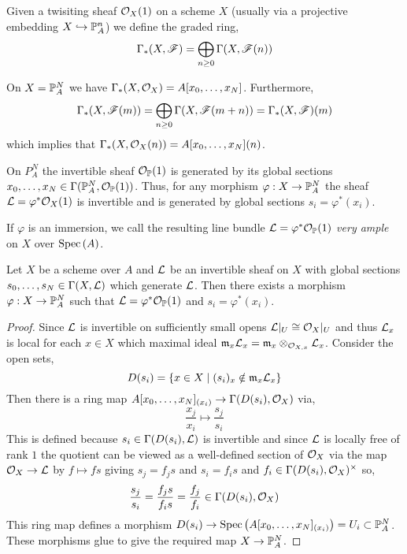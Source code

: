 \documentclass[12pt]{article}
\begin{document}
\begin{definition}
Given a twisiting sheaf $\struct{X}(1)$ on a scheme $X$ (usually via a projective embedding $X \embed \P^n_A$) we define the graded ring,
\[ \Gamma_*(X, \F) = \bigoplus_{n \ge 0} \Gamma(X, \F(n)) \]
\end{definition}


\begin{proposition}
On $X = \P^N_A$ we have $\Gamma_*(X, \struct{X}) = A[x_0, \dots, x_N]$. 
Furthermore,
\[ \Gamma_*(X, \F(m)) = \bigoplus_{n \ge 0} \Gamma(X, \F(m + n)) = \Gamma_*(X, \F)(m) \]
which implies that $\Gamma_*(X, \struct{X}(n)) = A[x_0, \dots, x_N](n)$.  
\end{proposition}

\begin{proposition}
On $P^N_A$ the invertible sheaf $\struct{\P}(1)$ is generated by its global sections $x_0, \dots, x_N \in \Gamma(\P^N_A, \struct{\P}(1))$. Thus, for any morphism $\varphi : X \to \P^N_A$ the sheaf $\L = \varphi^* \struct{X}(1)$ is invertible and is generated by global sections $s_i = \varphi^*(x_i)$. 
\end{proposition}

\begin{definition}
If $\varphi$ is an immersion, we call the resulting line bundle $\L = \varphi^* \struct{\P}(1)$ \textit{very ample} on $X$ over $\Spec{A}$.
\end{definition}

\begin{theorem}
Let $X$ be a scheme over $A$ and $\L$ be an invertible sheaf on $X$ with global sections $s_0, \dots, s_N \in \Gamma(X, \L)$ which generate $\L$. Then there exists a morphism $\varphi : X \to \P^N_A$ such that $\L = \varphi^* \struct{\P}(1)$ and $s_i = \varphi^*(x_i)$. 
\end{theorem}

\begin{proof}
Since $\L$ is invertible on sufficiently small opens $\L |_U \cong \struct{X} |_U$ and thus $\L_x$ is local for each $x \in X$ which maximal ideal $\m_x \L_x = \m_x \otimes_{\stalk{X}{x}} \L_x$. 
Consider the open sets,
\[ D(s_i) = \{ x \in X \mid (s_i)_x \notin \m_x \L_x \} \]
Then there is a ring map $A[x_0, \dots, x_N]_{(x_i)} \to \Gamma(D(s_i), \struct{X})$ via,
\[ \frac{x_j}{x_i} \mapsto \frac{s_j}{s_i} \]
This is defined because $s_i \in \Gamma(D(s_i), \L)$ is invertible and since $\L$ is locally free of rank $1$ the quotient can be viewed as a well-defined section of $\struct{X}$ via the map $\struct{X} \to \L$ by $f \mapsto f s$ giving $s_j = f_j s$ and $s_i = f_i s$ and $f_i \in \Gamma(D(s_i), \struct{X})^\times$ so,
\[ \frac{s_j}{s_i} = \frac{f_j s}{f_i s} = \frac{f_j}{f_i} \in \Gamma(D(s_i), \struct{X}) \]
This ring map defines a morphism $D(s_i) \to \Spec{A[x_0, \dots, x_N]_{(x_i)}} = U_i \subset \P^N_A$. These morphisms glue to give the required map $X \to \P^N_A$. 
\end{proof}
\end{document}
